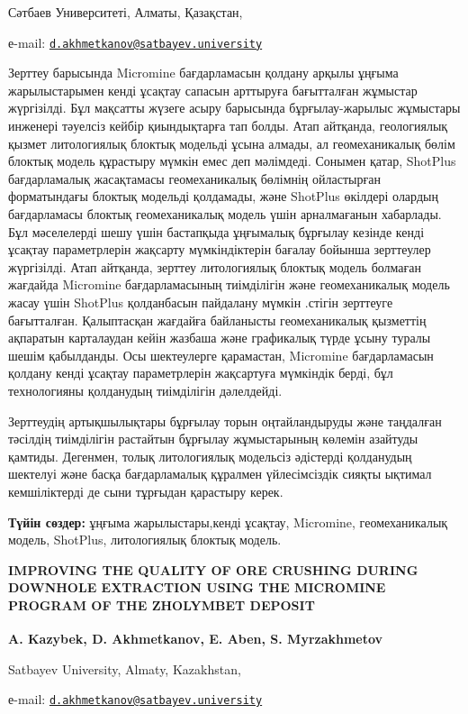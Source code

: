 Сәтбаев Университеті, Алматы, Қазақстан,

е-mail:
\href{mailto:d.akhmetkanov@satbayev.university}{\nolinkurl{d.akhmetkanov@satbayev.university}}

Зерттеу барысында Micromine бағдарламасын қолдану арқылы ұңғыма
жарылыстарымен кенді ұсақтау сапасын арттыруға бағытталған жұмыстар
жүргізілді. Бұл мақсатты жүзеге асыру барысында бұрғылау-жарылыс
жұмыстары инженері тәуелсіз кейбір қиындықтарға тап болды. Атап
айтқанда, геологиялық қызмет литологиялық блоктық модельді ұсына алмады,
ал геомеханикалық бөлім блоктық модель құрастыру мүмкін емес деп
мәлімдеді. Сонымен қатар, ShotPlus бағдарламалық жасақтамасы
геомеханикалық бөлімнің ойластырған форматындағы блоктық модельді
қолдамады, және ShotPlus өкілдері олардың бағдарламасы блоктық
геомеханикалық модель үшін арналмағанын хабарлады. Бұл мәселелерді шешу
үшін бастапқыда ұңғымалық бұрғылау кезінде кенді ұсақтау параметрлерін
жақсарту мүмкіндіктерін бағалау бойынша зерттеулер жүргізілді. Атап
айтқанда, зерттеу литологиялық блоктық модель болмаған жағдайда
Micromine бағдарламасының тиімділігін және геомеханикалық модель жасау
үшін ShotPlus қолданбасын пайдалану мүмкін .стігін зерттеуге
бағытталған. Қалыптасқан жағдайға байланысты геомеханикалық қызметтің
ақпаратын карталаудан кейін жазбаша және графикалық түрде ұсыну туралы
шешім қабылданды. Осы шектеулерге қарамастан, Micromine бағдарламасын
қолдану кенді ұсақтау параметрлерін жақсартуға мүмкіндік берді, бұл
технологияны қолданудың тиімділігін дәлелдейді.

Зерттеудің артықшылықтары бұрғылау торын оңтайландыруды және таңдалған
тәсілдің тиімділігін растайтын бұрғылау жұмыстарының көлемін азайтуды
қамтиды. Дегенмен, толық литологиялық модельсіз әдістерді қолданудың
шектелуі және басқа бағдарламалық құралмен үйлесімсіздік сияқты ықтимал
кемшіліктерді де сыни тұрғыдан қарастыру керек.

{\bfseries Түйін сөздер:} ұңғыма жарылыстары,кенді ұсақтау, Micromine,
геомеханикалық модель, ShotPlus, литологиялық блоктық модель.

{\bfseries IMPROVING THE QUALITY OF ORE CRUSHING DURING DOWNHOLE EXTRACTION
USING THE MICROMINE PROGRAM OF THE ZHOLYMBET DEPOSIT}

{\bfseries A. Kazybek, D. Akhmetkanov\textsuperscript{\envelope }, E. Aben, S.
Myrzakhmetov}

Satbayev University, Almaty, Kazakhstan,

е-mail:
\href{mailto:d.akhmetkanov@satbayev.university}{\nolinkurl{d.akhmetkanov@satbayev.university}}

